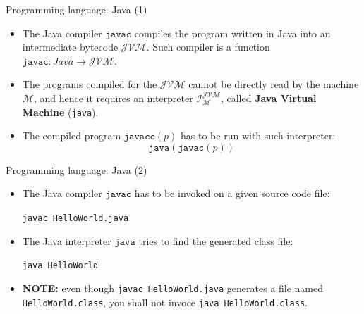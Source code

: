 \documentclass{beamer}
\begin{document}
\begin{frame}{Programming language: Java (1)}
	\begin{itemize}
		\item The Java compiler $\texttt{javac}$ compiles the program written in Java into an intermediate bytecode $\mathcal{JVM}$. Such compiler is a function $\texttt{javac}\colon Java\to \mathcal{JVM}$.
		\item The programs compiled for the $\mathcal{JVM}$ cannot be directly read by the machine $\mathcal{M}$, and hence it requires an interpreter $\mathcal{I}_{\mathcal{M}}^{\mathcal{JVM}}$, called \textbf{Java Virtual Machine} (\texttt{java}).
		\item The compiled program $\texttt{javacc}(p)$ has to be run with such interpreter:
		\[\texttt{java}(\texttt{javac}(p))\]
	\end{itemize}
\end{frame}



\begin{frame}{Programming language: Java (2)}
	\begin{itemize}
		\item The Java compiler $\texttt{javac}$ has to be invoked on a given source code file:
		\begin{center}
			\texttt{javac HelloWorld.java}
		\end{center}
		\item The Java interpreter $\texttt{java}$ tries to find the generated class file:
		\begin{center}
			\texttt{java HelloWorld}
		\end{center}
		\item \textbf{NOTE:} even though \texttt{javac HelloWorld.java} generates a file named \texttt{HelloWorld.class}, you shall not invoce \texttt{java HelloWorld.class}.
	\end{itemize}
\end{frame}
\end{document}
